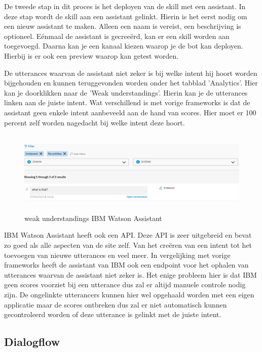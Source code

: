De tweede stap in dit proces is het deployen van de skill met een assistant. In deze stap wordt de skill aan een assistant gelinkt. Hierin is het eerst nodig om een nieuw assistant te maken. Alleen een naam is vereist, een beschrijving is optioneel. Eénmaal de assistant is gecreeërd, kan er een skill worden aan toegevoegd. Daarna kan je een kanaal kiezen waarop je de bot kan deployen. Hierbij is er ook een preview waarop kan getest worden.

De utterances waarvan de assistant niet zeker is bij welke intent hij hoort worden bijgehouden en kunnen teruggevonden worden onder het tabblad 'Analytics'. Hier kan je doorklikken naar de 'Weak understandings'. Hierin kan je de utterances linken aan de juiste intent. Wat verschillend is met vorige frameworks is dat de assistant geen enkele intent aanbeveeld aan de hand van scores. Hier moet er 100 percent zelf worden nagedacht bij welke intent deze hoort.

\begin{figure}[h!]
	\centering
	\includegraphics[height=4cm]{img/weak.png}
	\caption{weak understandings IBM Watson Assistant}
	\label{fig:weak}
\end{figure}

IBM Watson Assistant heeft ook een API. Deze API is zeer uitgebreid en bevat zo goed als alle aspecten van de site zelf. Van het creëren van een intent tot het toevoegen van nieuwe utterances en veel meer. In vergelijking met vorige frameworks heeft de assistant van IBM ook een endpoint voor het ophalen van utterances waarvan de assistant niet zeker is. Het enige probleem hier is dat IBM geen scores voorziet bij een utterance dus zal er altijd manuele controle nodig zijn. De ongelinkte utterancers kunnen hier wel opgehaald worden met een eigen applicatie maar de scores ontbreken dus zal er niet automatisch kunnen gecontroleerd worden of deze utterance is gelinkt met de juiste intent.

\subsection{Dialogflow}
\label{dialogflow}

